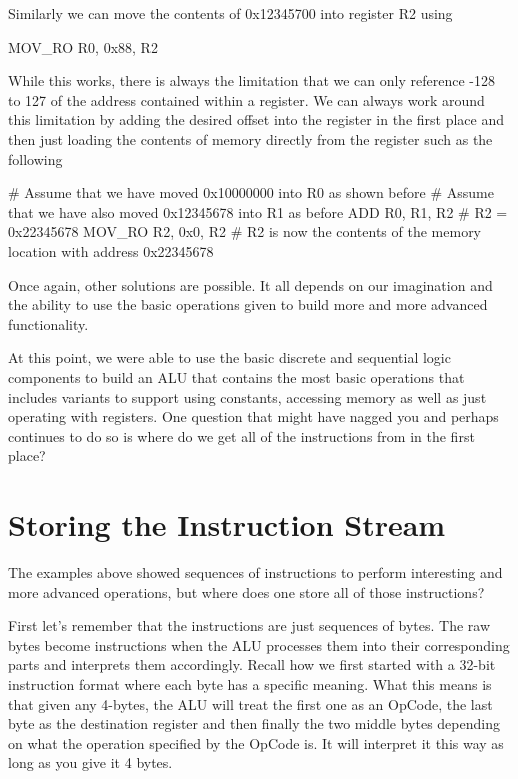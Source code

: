 Similarly we can move the contents of 0x12345700 into register R2 using

\begin{code}
MOV_RO R0, 0x88, R2
\end{code}

While this works, there is always the limitation that we can only reference -128 to 127 of the address contained within a register. We can always work around this limitation by adding the desired offset into the register in the first place and then just loading the contents of memory directly from the register such as the following

\begin{code}
# Assume that we have moved 0x10000000 into R0 as shown before
# Assume that we have also moved 0x12345678 into R1 as before
ADD R0, R1, R2 # R2 = 0x22345678
MOV_RO R2, 0x0, R2 # R2 is now the contents of the memory location with address 0x22345678
\end{code}

Once again, other solutions are possible. It all depends on our imagination and the ability to use the basic operations given to build more and more advanced functionality.

At this point, we were able to use the basic discrete and sequential logic components to build an ALU that contains the most basic operations that includes variants to support using constants, accessing memory as well as just operating with registers. One question that might have nagged you and perhaps continues to do so is where do we get all of the instructions from in the first place?

\section{Storing the Instruction Stream}

The examples above showed sequences of instructions to perform interesting and more advanced operations, but where does one store all of those instructions?

First let’s remember that the instructions are just sequences of bytes. The raw bytes become instructions when the ALU processes them into their corresponding parts and interprets them accordingly. Recall how we first started with a 32-bit instruction format where each byte has a specific meaning. What this means is that given any 4-bytes, the ALU will treat the first one as an OpCode, the last byte as the destination register and then finally the two middle bytes depending on what the operation specified by the OpCode is. It will interpret it this way as long as you give it 4 bytes. 

